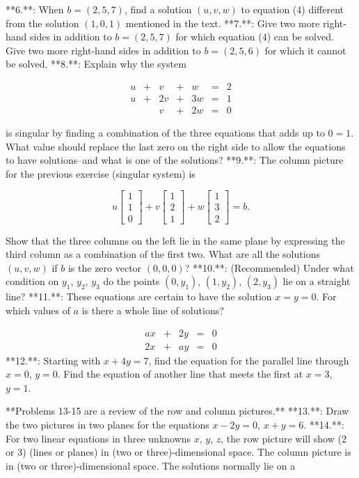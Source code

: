 

**6.**: When \(b=(2,5,7)\), find a solution \((u,v,w)\) to equation (4) different from the solution \((1,0,1)\) mentioned in the text.
**7.**: Give two more right-hand sides in addition to \(b=(2,5,7)\) for which equation (4) can be solved. Give two more right-hand sides in addition to \(b=(2,5,6)\) for which it cannot be solved.
**8.**: Explain why the system

\[\begin{array}{ccccccc}u&+&v&+&w&=&2\\ u&+&2v&+&3w&=&1\\ &&v&+&2w&=&0\end{array}\]

is singular by finding a combination of the three equations that adds up to \(0=1\). What value should replace the last zero on the right side to allow the equations to have solutions--and what is one of the solutions?
**9.**: The column picture for the previous exercise (singular system) is

\[u\begin{bmatrix}1\\ 1\\ 0\end{bmatrix}+v\begin{bmatrix}1\\ 2\\ 1\end{bmatrix}+w\begin{bmatrix}1\\ 3\\ 2\end{bmatrix}=b.\]

Show that the three columns on the left lie in the same plane by expressing the third column as a combination of the first two. What are all the solutions \((u,v,w)\) if \(b\) is the zero vector \((0,0,0)\)?
**10.**: (Recommended) Under what condition on \(y_{1}\), \(y_{2}\), \(y_{3}\) do the points \((0,y_{1})\), \((1,y_{2})\), \((2,y_{3})\) lie on a straight line?
**11.**: These equations are certain to have the solution \(x=y=0\). For which values of \(a\) is there a whole line of solutions?

\[\begin{array}{ccccccc}ax&+&2y&=&0\\ 2x&+&ay&=&0\end{array}\]
**12.**: Starting with \(x+4y=7\), find the equation for the parallel line through \(x=0\), \(y=0\). Find the equation of another line that meets the first at \(x=3\), \(y=1\).

**Problems 13-15 are a review of the row and column pictures.**
**13.**: Draw the two pictures in two planes for the equations \(x-2y=0\), \(x+y=6\).
**14.**: For two linear equations in three unknowns \(x\), \(y\), \(z\), the row picture will show (2 or 3) (lines or planes) in (two or three)-dimensional space. The column picture is in (two or three)-dimensional space. The solutions normally lie on a